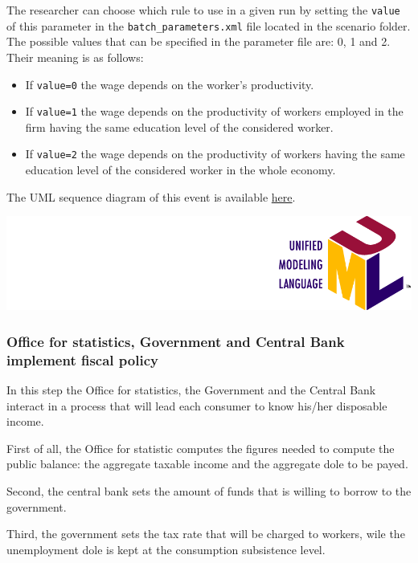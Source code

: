 \documentclass{book}
\newcommand{\doclocation}{file:///Users/giulioni/Documents/workspace/gabriele/docs}
\begin{document}
\vskip2mm
The researcher can choose which rule to use in a given run by setting the \verb+value+ of this parameter in the \verb+batch_parameters.xml+ file located in the scenario folder.
The possible values that can be specified in the parameter file are: 0, 1 and 2. Their meaning is as follows:
\begin{itemize}
	\item 
		If \verb+value=0+ the wage depends on the worker's productivity.
	\item 
		If \verb+value=1+ the wage depends on the productivity of workers employed in the firm having the same education level of the considered worker.
	\item 
		If \verb+value=2+ the wage depends on the productivity of workers having the same education level of the considered worker in the whole economy.

\end{itemize}

The UML sequence diagram of this event is available \href{\doclocation/umldoc/setWorkersWage.html}{here}.
\begin{marginfigure}
	\includegraphics[scale=0.1]{uml.png}
\end{marginfigure}

\subsubsection{Office for statistics, Government and Central Bank implement fiscal policy}

In this step the Office for statistics, the Government and the Central Bank interact in a process that will lead each consumer to know his/her disposable income.

First of all, the Office for statistic computes the figures needed to compute the public balance: the aggregate taxable income and the aggregate dole to be payed.

Second, the central bank sets the amount of funds that is willing to borrow to the government.

Third, the government sets the tax rate that will be charged to workers, wile the unemployment dole is kept at the consumption subsistence level.
\end{document}
